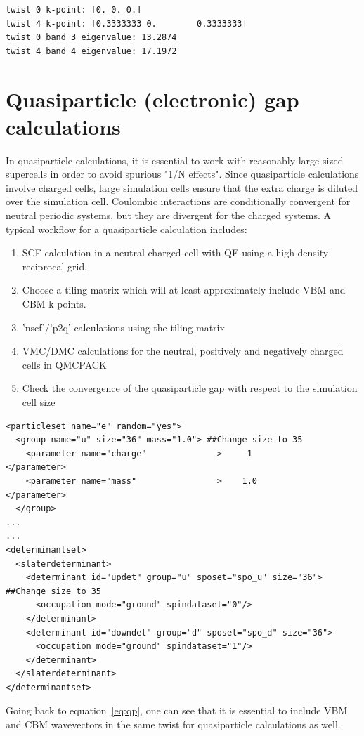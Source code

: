 \begin{lstlisting}[style=Python]
twist 0 k-point: [0. 0. 0.]
twist 4 k-point: [0.3333333 0.        0.3333333]
twist 0 band 3 eigenvalue: 13.2874
twist 4 band 4 eigenvalue: 17.1972
\end{lstlisting}

\section{Quasiparticle (electronic) gap calculations}\label{sec:lab_ex_qp}
In quasiparticle calculations, it is essential to work with reasonably large sized supercells in order to avoid spurious "1/N effects". 
Since quasiparticle calculations involve charged cells, large simulation cells ensure that the extra charge is diluted over the simulation cell. Coulombic interactions are conditionally convergent for neutral periodic systems, but they are divergent for the charged systems. 
A typical workflow for a quasiparticle calculation includes:
\begin{enumerate}
	\item SCF calculation in a neutral charged cell with QE using a high-density reciprocal grid.
	\item Choose a tiling matrix which will at least approximately include VBM and CBM k-points. 
	\item 'nscf'/'p2q' calculations using the tiling matrix 
	\item VMC/DMC calculations for the neutral, positively and negatively charged cells in QMCPACK
	\item Check the convergence of the quasiparticle gap with respect to the simulation cell size
\end{enumerate}
\begin{lstlisting}[style=QMCPXML]
<particleset name="e" random="yes">
  <group name="u" size="36" mass="1.0"> ##Change size to 35
    <parameter name="charge"              >    -1                    </parameter>
    <parameter name="mass"                >    1.0                   </parameter>
  </group>
...
...
<determinantset>
  <slaterdeterminant>
    <determinant id="updet" group="u" sposet="spo_u" size="36"> ##Change size to 35
      <occupation mode="ground" spindataset="0"/>	
    </determinant>
    <determinant id="downdet" group="d" sposet="spo_d" size="36">
      <occupation mode="ground" spindataset="1"/>	
    </determinant>
  </slaterdeterminant>
</determinantset>
\end{lstlisting}
Going back to equation~\ref{eq:qp}, one can see that it is essential to include VBM and CBM wavevectors in the same twist for quasiparticle calculations as well. 
